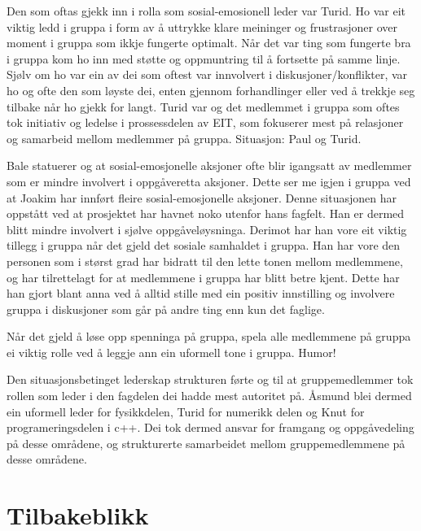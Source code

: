 Den som oftas gjekk inn i rolla som sosial-emosionell leder var Turid. Ho var eit viktig ledd i gruppa i form av å uttrykke klare meininger og frustrasjoner over moment i gruppa som ikkje fungerte optimalt. Når det var ting som fungerte bra i gruppa kom ho inn med støtte og oppmuntring til å fortsette på samme linje. Sjølv om ho var ein av dei som oftest var innvolvert i diskusjoner/konflikter, var ho og ofte den som løyste dei, enten gjennom forhandlinger eller ved å trekkje seg tilbake når ho gjekk for langt. Turid var og det medlemmet i gruppa som oftes tok initiativ og ledelse i prossessdelen av EIT, som fokuserer mest på relasjoner og samarbeid mellom medlemmer på gruppa. 
Situasjon: Paul og Turid.

Bale statuerer og at sosial-emosjonelle aksjoner ofte blir igangsatt av medlemmer som er mindre involvert i oppgåveretta aksjoner. Dette ser me igjen i gruppa ved at Joakim har innført fleire sosial-emosjonelle aksjoner. Denne situasjonen har oppstått ved at prosjektet har havnet noko utenfor hans fagfelt. Han er dermed blitt mindre involvert i sjølve oppgåveløysninga. Derimot har han vore eit viktig tillegg i gruppa når det gjeld det sosiale samhaldet i gruppa. Han har vore den personen som i størst grad har bidratt til den lette tonen mellom medlemmene, og har tilrettelagt for at medlemmene i gruppa har blitt betre kjent. Dette har han gjort blant anna ved å alltid stille med ein positiv innstilling og involvere gruppa i diskusjoner som går på andre ting enn kun det faglige.


Når det gjeld å løse opp spenninga på gruppa, spela alle medlemmene på gruppa ei viktig rolle ved å leggje ann ein uformell tone i gruppa.
Humor!


Den situasjonsbetinget lederskap strukturen førte og til at gruppemedlemmer tok rollen som leder i den fagdelen dei hadde mest autoritet på. Åsmund blei dermed ein uformell leder for fysikkdelen, Turid for numerikk delen og Knut for programeringsdelen i c++. Dei tok dermed ansvar for framgang og oppgåvedeling på desse områdene, og strukturerte samarbeidet mellom gruppemedlemmene på desse områdene. 

\section{Tilbakeblikk}
